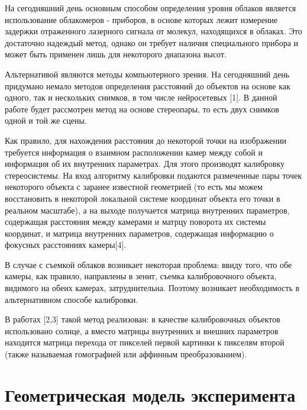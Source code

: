 \documentclass[11pt]{article} %
\begin{document}
	На сегодняшний день основным способом определения уровня облаков является
	использование облакомеров - приборов, в основе которых лежит измерение задержки отраженного лазерного сигнала от молекул, находящихся в облаках. Это достаточно надеждый метод, однако он требует наличия специального прибора и может
	быть применен лишь для некоторого диапазона высот. \par
	Альтернативой являются методы компьютерного зрения. На сегодняшний день
	придумано немало методов определения расстояний до объектов на основе как одного, так и нескольких снимков, в том числе нейросетевых [1]. В данной работе будет
	рассмотрен метод на основе стереопары, то есть двух снимков одной и той же сцены.\par
	Как правило, для нахождения расстояния до некоторой точки на изображении
	требуется информация о взаимном расположении камер между собой и информация
	об их внутренних параметрах. Для этого производят калибровку стереосистемы. На
	вход алгоритму калибровки подаются размеченные пары точек некоторого объекта
	с заранее известной геометрией (то есть мы можем восстановить в некоторой локальной системе координат объекта его точки в реальном масштабе), а на выходе
	получается матрица внутренних параметров, содержащая расстояния между камерами и матрцу поворота их системы координат, и матрица внутренних параметров,
	содержащая информацию о фокусных расстояниях камеры[4].\par
	В случае с съемкой облаков возникает некоторая проблема: ввиду того, что обе
	камеры, как правило, направлены в зенит, съемка калибровочного объекта, видимого на обеих камерах, затруднительна. Поэтому возникает необходимость в альтернативном способе калибровки.\par
	В работах [2,3] такой метод реализован: в качестве калибровочных объектов использовано солнце, а вместо матрицы внутренних и внешних параметров находится
	матрица перехода от пикселей первой картинки к пикселям второй (также называемая гомографией или аффинным преобразованием).
	
	\pagebreak
	
	\section{Геометрическая модель эксперимента}
	\vspace{3mm}\hspace{5mm}
	
\end{document}
